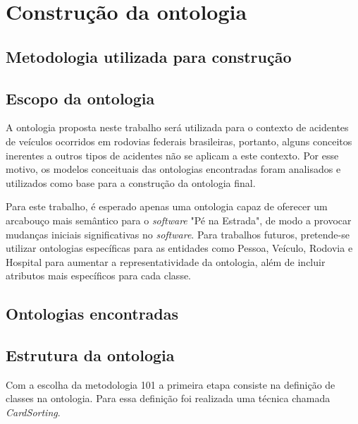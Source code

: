 \chapter{Construção da ontologia}

  \section{Metodologia utilizada para construção}
    
   
    
  \section{Escopo da ontologia}
      
      A ontologia proposta neste trabalho será utilizada para o contexto de acidentes de veículos ocorridos em rodovias
      federais brasileiras, portanto, alguns conceitos inerentes a outros tipos de acidentes não se aplicam a este 
      contexto. Por esse motivo, os modelos conceituais das ontologias encontradas foram analisados e utilizados como base 
      para a construção da ontologia final.
      
      Para este trabalho, é esperado apenas uma ontologia capaz de oferecer um arcabouço mais semântico para o \textit{software} 
      "Pé na Estrada", de modo a provocar mudanças iniciais significativas no \textit{software}.
      Para trabalhos futuros, pretende-se utilizar ontologias específicas para as entidades como Pessoa, Veículo, Rodovia e
      Hospital para aumentar a representatividade da ontologia, 
      além de incluir atributos mais específicos para cada classe.
  
  \vfill
  \pagebreak
  \section{Ontologias encontradas}
   
      
      
  \vfill
  \pagebreak
  \section{Estrutura da ontologia}

      Com a escolha da metodologia 101 a primeira etapa consiste na definição de classes na ontologia.
      Para essa definição foi realizada uma técnica chamada \textit{CardSorting}. 
      
